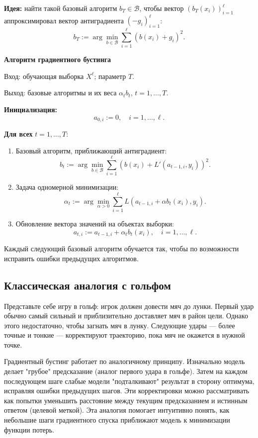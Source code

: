 \textbf{Идея:} найти такой базовый алгоритм $b_T \in \mathcal{B}$, чтобы вектор $(b_T(x_i))_{i=1}^\ell$ аппроксимировал вектор антиградиента $(-g_i)_{i=1}^\ell$:
\[
b_T := \arg\min_{b \in \mathcal{B}} \sum_{i=1}^\ell \left(b(x_i) + g_i \right)^2.
\]

\textbf{Алгоритм градиентного бустинга}

Вход: обучающая выборка $X^\ell$; параметр $T$.

Выход: базовые алгоритмы и их веса $\alpha_t b_t$, $t = 1, \dots, T$.

\textbf{Инициализация:}
\[
a_{0,i} := 0, \quad i = 1, \dots, \ell.
\]

\textbf{Для всех} $t = 1, \dots, T$:
\begin{enumerate}
    \item Базовый алгоритм, приближающий антиградиент:
    \[
    b_t := \arg\min_{b \in \mathcal{B}} \sum_{i=1}^\ell \left(b(x_i) + L'(a_{t-1,i}, y_i) \right)^2.
    \]
    \item Задача одномерной минимизации:
    \[
    \alpha_t := \arg\min_{\alpha > 0} \sum_{i=1}^\ell L(a_{t-1,i} + \alpha b_t(x_i), y_i).
    \]
    \item Обновление вектора значений на объектах выборки:
    \[
    a_{t,i} := a_{t-1,i} + \alpha_t b_t(x_i), \quad i = 1, \dots, \ell.
    \]
\end{enumerate}

Каждый следующий базовый алгоритм обучается так, чтобы по возможности исправить ошибки предыдущих алгоритмов.

\subsection{Классическая аналогия с гольфом}

Представьте себе игру в гольф: игрок должен довести мяч до лунки. Первый удар обычно самый сильный и приблизительно доставляет мяч в район цели. Однако этого недостаточно, чтобы загнать мяч в лунку. Следующие удары — более точные и тонкие — корректируют траекторию, пока мяч не окажется в нужной точке.

Градиентный бустинг работает по аналогичному принципу. Изначально модель делает "грубое" предсказание (аналог первого удара в гольфе). Затем на каждом последующем шаге слабые модели "подталкивают" результат в сторону оптимума, исправляя ошибки предыдущих шагов. Эти корректировки можно рассматривать как попытки уменьшить расстояние между текущим предсказанием и истинным ответом (целевой меткой). Эта аналогия помогает интуитивно понять, как небольшие шаги градиентного спуска приближают модель к минимизации функции потерь.

